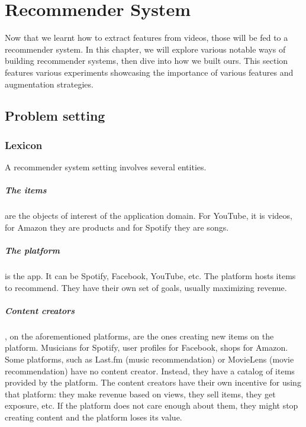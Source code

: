 \chapter{Recommender System}

Now that we learnt how to extract features from videos, those will be fed to a recommender system. In this chapter, we will explore various notable ways of building recommender systems, then dive into how we built ours. This section features various experiments showcasing the importance of various features and augmentation strategies.

\section{Problem setting}
\subsection{Lexicon}

A recommender system setting involves several entities.

\paragraph{The items} are the objects of interest of the application domain. For YouTube, it is videos, for Amazon they are products and for Spotify they are songs.

\paragraph{The platform} is the app. It can be Spotify, Facebook, YouTube, etc. The platform hosts items to recommend. They have their own set of goals, usually maximizing revenue.

\paragraph{Content creators}, on the aforementioned platforms, are the ones creating new items on the platform. Musicians for Spotify, user profiles for Facebook, shops for Amazon. Some platforms, such as Last.fm  (music recommendation) or MovieLens (movie recommendation) have no content creator. Instead, they have a catalog of items provided by the platform. The content creators have their own incentive for using that platform: they make revenue based on views, they sell items, they get exposure, etc. If the platform does not care enough about them, they might stop creating content and the platform loses its value.

